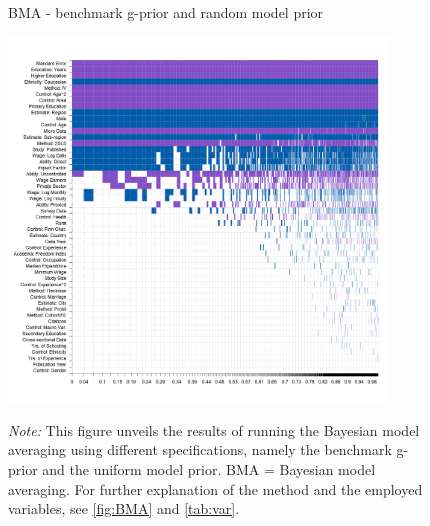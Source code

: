 \begin{figure}[!htbp]
\begin{center}
\caption{BMA - benchmark g-prior and random model prior}
\label{fig:BMA3}
\includegraphics[width=0.9\textwidth]{Figures/BMA/bma_BRIC_random_results.png}
\end{center}\vspace{-0.5cm}
\captionsetup{width=0.9\textwidth, font = scriptsize}
\caption*{\emph{Note:} This figure unveils the results of running the Bayesian model averaging using different specifications, namely the benchmark g-prior and the uniform model prior. BMA = Bayesian model averaging. For further explanation of the method and the employed variables, see \autoref{fig:BMA} and \autoref{tab:var}.
}
\end{figure}

